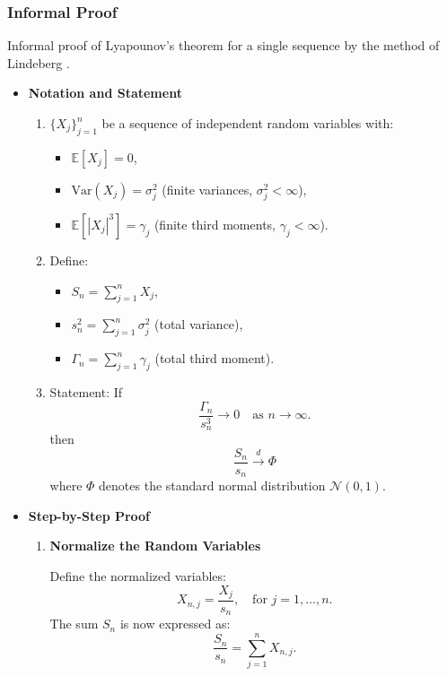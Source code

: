 \subsubsection{Informal Proof}
Informal proof of Lyapounov's theorem for a single sequence by the method of Lindeberg \cite{chung2000course}.
\begin{itemize}
    \item \textbf{Notation and Statement}
    \begin{enumerate}
    \item \( \{X_j\}_{j=1}^n \) be a sequence of independent random variables with:
    \begin{itemize}
        \item[] \( \mathbb{E}[X_j] = 0 \), 
        \item[] \( \text{Var}(X_j) = \sigma_j^2 \) (finite variances, \( \sigma_j^2 < \infty \)),
        \item[] \( \mathbb{E}[|X_j|^3] = \gamma_j \) (finite third moments, \( \gamma_j < \infty \)).
    \end{itemize}

        \item Define:
        \begin{itemize}
            \item[] \( S_n = \sum_{j=1}^n X_j \),
            \item[] \( s_n^2 = \sum_{j=1}^n \sigma_j^2 \) (total variance),
            \item[] \( \Gamma_n = \sum_{j=1}^n \gamma_j \) (total third moment).
        \end{itemize}

        \item Statement:
    If 
    \[
   \frac{\Gamma_n}{s_n^3} \to 0 \quad \text{as } n \to \infty.
   \]
   then 
   \[
   \frac{S_n}{s_n} \xrightarrow{d} \Phi
   \]
   where \( \Phi\) denotes the standard normal distribution \( \mathcal{N}(0,1) \).
   
    \end{enumerate}
    \item \textbf{Step-by-Step Proof}
    \begin{enumerate}
        \item \textbf{Normalize the Random Variables}
        
        Define the normalized variables:
\[
X_{n,j} = \frac{X_j}{s_n}, \quad \text{for } j = 1, \dots, n.
\]
The sum \( S_n \) is now expressed as:
\[
\frac{S_n}{s_n} = \sum_{j=1}^n X_{n,j}.
\]


\end{enumerate}
\end{itemize}
